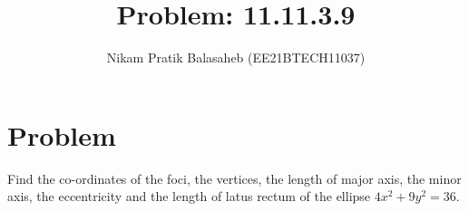 \documentclass[journal,12pt,twocolumn]{IEEEtran}
\begin{document}
\let\StandardTheFigure\thefigure
\let\vec\mathbf
\renewcommand{\thefigure}{\theproblem}



\def\putbox#1#2#3{\makebox[0in][l]{\makebox[#1][l]{}\raisebox{\baselineskip}[0in][0in]{\raisebox{#2}[0in][0in]{#3}}}}
     \def\rightbox#1{\makebox[0in][r]{#1}}
     \def\centbox#1{\makebox[0in]{#1}}
     \def\topbox#1{\raisebox{-\baselineskip}[0in][0in]{#1}}
     \def\midbox#1{\raisebox{-0.5\baselineskip}[0in][0in]{#1}}

\vspace{3cm}


\title{Problem: 11.11.3.9}
\author{Nikam Pratik Balasaheb (EE21BTECH11037)}





\maketitle

\newpage


\bigskip

\renewcommand{\thefigure}{\theenumi}
\renewcommand{\thetable}{\theenumi}

\section{Problem}
Find the co-ordinates of the foci, the vertices, the length of major axis, the minor axis, the eccentricity and the length of latus rectum of the ellipse $4x^2+9y^2=36$.
\end{document}
